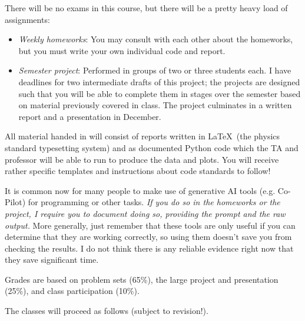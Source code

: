 \documentclass[11pt, preprint]{aastex}
\begin{document}
\noindent There will be no exams in this course, but there will be a
pretty heavy load of assignments:
\begin{itemize}
\item {\it Weekly homeworks}: You may consult with each other about
  the homeworks, but you must write your own individual code and
  report.
\item {\it Semester project}: Performed in groups of two or three
  students each. I have deadlines for two intermediate drafts of this
  project; the projects are designed such that you will be able to
  complete them in stages over the semester based on material
  previously covered in class. The project culminates in a written
  report and a presentation in December.
\end{itemize}
All material handed in will consist of reports written in \LaTeX\ (the
physics standard typesetting system) and as documented Python code
which the TA and professor will be able to run to produce the data and
plots. You will receive rather specific templates and instructions
about code standards to follow!

\noindent It is common now for many people to make use of generative
AI tools (e.g. Co-Pilot) for programming or other tasks. {\it If you
  do so in the homeworks or the project, I require you to document
  doing so, providing the prompt and the raw output.} More generally,
just remember that these tools are only useful if you can determine
that they are working correctly, so using them doesn't save you from
checking the results. I do not think there is any reliable evidence
right now that they save significant time.

\noindent Grades are based on problem sets (65\%), the large project
and presentation (25\%), and class participation (10\%).

\noindent The classes will proceed as follows (subject to
revision!). 
\end{document}

